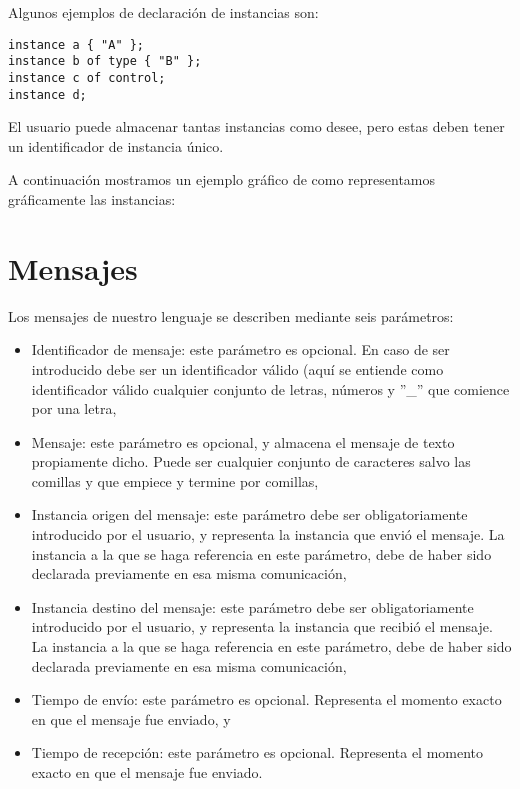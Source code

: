 Algunos ejemplos de declaración de instancias son:

\begin{lstlisting}
instance a { "A" };
instance b of type { "B" };
instance c of control;
instance d;
\end{lstlisting}

El usuario puede almacenar tantas instancias como desee, pero estas
deben tener un identificador de instancia único.

A continuación mostramos un ejemplo gráfico de como representamos
gráficamente las instancias:


\section{Mensajes}\label{sec:Mensajes}

Los mensajes de nuestro lenguaje se describen mediante seis
parámetros:

\begin{itemize}
\item Identificador de mensaje: este parámetro es opcional. En caso de
  ser introducido debe ser un identificador válido (aquí se entiende
  como identificador válido cualquier conjunto de letras, números y
  ''\_'' que comience por una letra,
\item Mensaje: este parámetro es opcional, y almacena el mensaje de
  texto propiamente dicho. Puede ser cualquier conjunto de caracteres
  salvo las comillas y que empiece y termine por comillas,
\item Instancia origen del mensaje: este parámetro debe ser
  obligatoriamente introducido por el usuario, y representa la
  instancia que envió el mensaje. La instancia a la que se haga
  referencia en este parámetro, debe de haber sido declarada
  previamente en esa misma comunicación,
\item Instancia destino del mensaje: este parámetro debe ser
  obligatoriamente introducido por el usuario, y representa la
  instancia que recibió el mensaje. La instancia a la que se haga
  referencia en este parámetro, debe de haber sido declarada
  previamente en esa misma comunicación,
\item Tiempo de envío: este parámetro es opcional. Representa el
  momento exacto en que el mensaje fue enviado, y
\item Tiempo de recepción: este parámetro es opcional. Representa el
  momento exacto en que el mensaje fue enviado.
\end{itemize}

